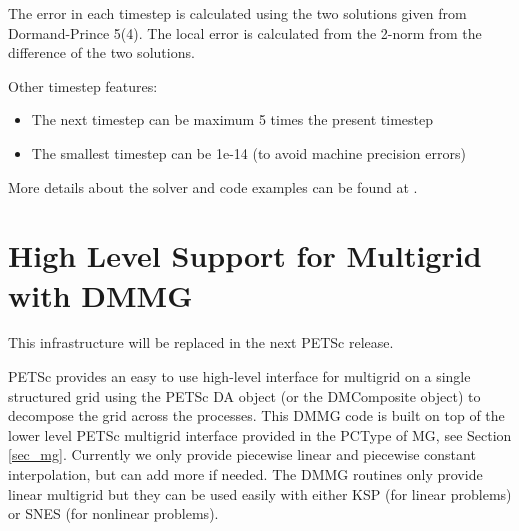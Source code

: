 The error in each timestep is calculated using the two solutions given
from Dormand-Prince 5(4). The local error is calculated from the
2-norm from the difference of the two solutions.

Other timestep features:
\begin{itemize}
  \item The next timestep can be maximum 5 times the present timestep
  \item The smallest timestep can be 1e-14 (to avoid machine precision
  errors)
\end{itemize}

More details about the solver and code examples can be found at
.


\cleardoublepage
\chapter{High Level Support for Multigrid with DMMG}
\label{chapter_dmmg}

This infrastructure will be replaced in the next PETSc release.

PETSc provides an easy to use high-level interface for multigrid on a
single structured grid using the PETSc DA object (or the DMComposite
object) to decompose the grid across the processes.  This DMMG code
is built on top of the lower level PETSc multigrid
interface provided in the PCType of MG, see Section
\ref{sec_mg}. Currently we only provide piecewise linear and piecewise
constant interpolation, but can add more if needed. The DMMG routines
only provide linear multigrid but they can be used easily with either
KSP (for linear problems) or SNES (for nonlinear problems).

